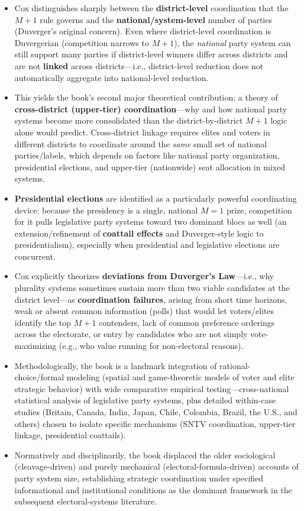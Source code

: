 \documentclass[12pt]{article}
\begin{document}
\begin{itemize}[leftmargin=*, itemsep=4pt]
    \item Cox distinguishes sharply between the \textbf{district-level} coordination that the $M+1$ rule governs and the \textbf{national/system-level} number of parties (Duverger's original concern). Even where district-level coordination is Duvergerian (competition narrows to $M+1$), the \emph{national} party system can still support many parties if district-level winners differ across districts and are not \textbf{linked} across districts---i.e., district-level reduction does not automatically aggregate into national-level reduction.
    \item This yields the book's second major theoretical contribution: a theory of \textbf{cross-district (upper-tier) coordination}---why and how national party systems become more consolidated than the district-by-district $M+1$ logic alone would predict. Cross-district linkage requires elites and voters in different districts to coordinate around the \emph{same} small set of national parties/labels, which depends on factors like national party organization, presidential elections, and upper-tier (nationwide) seat allocation in mixed systems.
    \item \textbf{Presidential elections} are identified as a particularly powerful coordinating device: because the presidency is a single, national $M=1$ prize, competition for it pulls legislative party systems toward two dominant blocs as well (an extension/refinement of \textbf{coattail effects} and Duverger-style logic to presidentialism), especially when presidential and legislative elections are concurrent.
    \item Cox explicitly theorizes \textbf{deviations from Duverger's Law}---i.e., why plurality systems sometimes sustain more than two viable candidates at the district level---as \textbf{coordination failures}, arising from short time horizons, weak or absent common information (polls) that would let voters/elites identify the top $M+1$ contenders, lack of common preference orderings across the electorate, or entry by candidates who are not simply vote-maximizing (e.g., who value running for non-electoral reasons).
    \item Methodologically, the book is a landmark integration of rational-choice/formal modeling (spatial and game-theoretic models of voter and elite strategic behavior) with wide comparative empirical testing---cross-national statistical analysis of legislative party systems, plus detailed within-case studies (Britain, Canada, India, Japan, Chile, Colombia, Brazil, the U.S., and others) chosen to isolate specific mechanisms (SNTV coordination, upper-tier linkage, presidential coattails).
    \item Normatively and disciplinarily, the book displaced the older sociological (cleavage-driven) and purely mechanical (electoral-formula-driven) accounts of party system size, establishing strategic coordination under specified informational and institutional conditions as the dominant framework in the subsequent electoral-systems literature.
\end{itemize}
\end{document}
